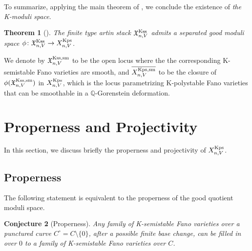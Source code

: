 \documentclass[12pt,reqno]{amsart}%
\newtheorem{thm}{Theorem}[section]
\newtheorem{conj}[thm]{Conjecture}
\theoremstyle{definition}
\newtheorem{rem}[thm]{Remark}
\theoremstyle{remark}
\begin{document}
To summarize, applying the main theorem of \cite{AHH18}, we conclude the existence of {\it the K-moduli space}. 
\begin{thm}[{\cite{ABHX19}}]\label{t-goodmoduli} 
The finite type artin stack $\mathfrak{X}^{\rm Kss}_{n,V}$ admits a separated good moduli space $\phi\colon \mathfrak{X}^{\rm Kss}_{n,V}\to X^{\rm Kps}_{n,V}$.
\end{thm}

We denote by $\mathfrak X^{\rm Kss, sm}_{n,V}$ to be the open locus where the the corresponding K-semistable Fano varieties are smooth, and $\overline{X^{\rm Kps, sm}_{n,V}}$ to be the closure of $\phi(\mathfrak X^{\rm Kss, sm}_{n,V})$ in  $X^{\rm Kps}_{n,V}$, which is the locus parametrizing K-polystable Fano varieties that can be smoothable in a $\mathbb Q$-Gorenstein deformation.




\section{Properness and Projectivity}\label{s-proj}
In this section, we discuss briefly the properness and projectivity of $ X^{\rm Kps}_{n,V}$. 

\subsection{Properness}

The following statement is equivalent to the properness of the good quotient moduli space. 

\begin{conj}[Properness]\label{c-proper}
Any family of K-semistable Fano varieties over a punctured curve $C^{\circ}=C\setminus \{0\}$, after a possible finite base change, can be filled in over $0$ to a family of K-semistable Fano varieties over $C$. 
\end{conj}
\end{document}
